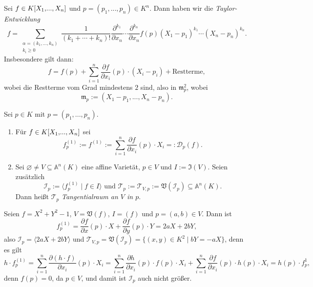 \documentclass[a4paper,12pt]{scrbook}
\theoremstyle{keinenummern} %
\theoremstyle{mitnummern}
\theoremstyle{unserbeweis}
\def\A{\mathbb{A}}
\def\V{\mathfrak{V}}
\def\I{\mathfrak{I}}
\def\II{\mathcal{I}}
\newcommand{\DD}{\mathcal{D}} %
\def\T{\mathcal{T}}
\def\m{\mathfrak{m}}
\newcommand{\leer}{\ensuremath{\varnothing}}
\let\olddotsc\dotsc %
\renewcommand{\dotsc}{\ensuremath{\!...}}
\newcommand{\polyx}[1][n]{\ensuremath%
  [X_{1},\dotsc,X_{#1}]}
\begin{document}
\begin{erinnerung}\label{3.3.1}
Sei $f\in K\polyx$ und $p=(p_{1},\dotsc,p_{n})\in K^{n}$. Dann haben wir die \emph{Taylor-Entwicklung}
\[f=\!\!\!\!\sum_{\substack{\alpha=(k_{1},\olddotsc,k_{n})\\k_{i}\geq 0}}\!\!\frac{1}{(k_{1}+\dotsm+k_{n})!}\frac{\partial^{k_{1}}}{\partial x_{n}}\dotsm\frac{\partial^{k_{n}}}{\partial x_{n}}f(p)(X_{1}-p_{1})^{k_{1}}\dotsm(X_{n}-p_{n})^{k_{n}}.\]
Insbesondere gilt dann:
\[f=f(p)+\sum_{i=1}^{n}\frac{\partial f}{\partial x_{i}}(p)\cdot(X_{i}-p_{i})+\text{Restterme},\]
wobei die Restterme vom Grad mindestens $2$ sind, also in $\m_{p}^{2}$, wobei
\[\m_{p}:=(X_{1}-p_{1},\dotsc,X_{n}-p_{n}).\]
\end{erinnerung}

\begin{dfn}\label{3.3.2}
Sei $p\in K$ mit $p=(p_{1},\dotsc,p_{n})$.
\begin{enumerate}
\item{} Für $f\in K\polyx$ sei
\[f_{p}^{(1)}:=f^{(1)}:=\sum_{i=1}^{n}\frac{\partial f}{\partial x_{i}}(p)\cdot X_{i}=:\DD_{p}(f).\]
\item{} Sei $\leer\neq V\subseteq\A^{n}(K)$ eine affine Varietät, $p\in V$ und $I:=\I(V)$. Seien zusätzlich
\[\II_{p}:=\langle f_{p}^{(1)}\mid f\in I\rangle\text{ und }\T_{p}:=\T_{V,p}:=\V(\II_{p})\subseteq\A^{n}(K).\]
Dann heißt $\T_{p}$ \emph{Tangentialraum an $V$ in $p$}.
\end{enumerate}\end{dfn}

\begin{bsp}\label{3.3.3}
Seien $f=X^{2}+Y^{2}-1$, $V=\V(f)$, $I=(f)$ und $p=(a,b)\in V$.
Dann ist
\[f_{p}^{(1)}=\frac{\partial f}{\partial x}(p)\cdot X+\frac{\partial f}{\partial y}(p)\cdot Y=2aX + 2bY,\]
also $\II_{p}=\langle 2aX+2bY \rangle$ und $\T_{V,p}=\V(\II_{p})=\{(x,y)\in K^{2}\mid bY=-aX\}$, denn es gilt
\[h\cdot f_{p}^{(1)}=\sum_{i=1}^{n}\frac{\partial(h\cdot f)}{\partial x_{i}}(p)\cdot X_{i}=\sum_{i=1}^{n}\frac{\partial h}{\partial x_{i}}(p)\cdot f(p)\cdot X_{i}+\sum_{i=1}^{n}\frac{\partial f}{\partial x_{i}}(p)\cdot h(p)\cdot X_{i}=h(p)\cdot f_{p}^{1},\]
denn $f(p)=0$, da $p\in V$, und damit ist $\II_{p}$ auch nicht größer.
\end{bsp}
\end{document}
